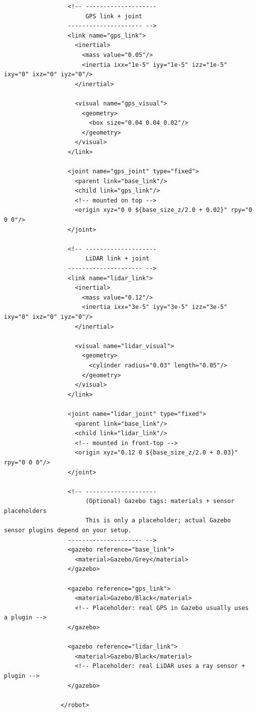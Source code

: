 \documentclass[a4paper]{article}
\begin{document}
\begin{verbatim}
                  <!-- --------------------
                       GPS link + joint
                  --------------------- -->
                  <link name="gps_link">
                    <inertial>
                      <mass value="0.05"/>
                      <inertia ixx="1e-5" iyy="1e-5" izz="1e-5" ixy="0" ixz="0" iyz="0"/>
                    </inertial>
                
                    <visual name="gps_visual">
                      <geometry>
                        <box size="0.04 0.04 0.02"/>
                      </geometry>
                    </visual>
                  </link>
                
                  <joint name="gps_joint" type="fixed">
                    <parent link="base_link"/>
                    <child link="gps_link"/>
                    <!-- mounted on top -->
                    <origin xyz="0 0 ${base_size_z/2.0 + 0.02}" rpy="0 0 0"/>
                  </joint>
                
                  <!-- --------------------
                       LiDAR link + joint
                  --------------------- -->
                  <link name="lidar_link">
                    <inertial>
                      <mass value="0.12"/>
                      <inertia ixx="3e-5" iyy="3e-5" izz="3e-5" ixy="0" ixz="0" iyz="0"/>
                    </inertial>
                
                    <visual name="lidar_visual">
                      <geometry>
                        <cylinder radius="0.03" length="0.05"/>
                      </geometry>
                    </visual>
                  </link>
                
                  <joint name="lidar_joint" type="fixed">
                    <parent link="base_link"/>
                    <child link="lidar_link"/>
                    <!-- mounted in front-top -->
                    <origin xyz="0.12 0 ${base_size_z/2.0 + 0.03}" rpy="0 0 0"/>
                  </joint>
                
                  <!-- --------------------
                       (Optional) Gazebo tags: materials + sensor placeholders
                       This is only a placeholder; actual Gazebo sensor plugins depend on your setup.
                  --------------------- -->
                  <gazebo reference="base_link">
                    <material>Gazebo/Grey</material>
                  </gazebo>
                
                  <gazebo reference="gps_link">
                    <material>Gazebo/Black</material>
                    <!-- Placeholder: real GPS in Gazebo usually uses a plugin -->
                  </gazebo>
                
                  <gazebo reference="lidar_link">
                    <material>Gazebo/Black</material>
                    <!-- Placeholder: real LiDAR uses a ray sensor + plugin -->
                  </gazebo>
                
                </robot>
        \end{verbatim}
\end{document}
